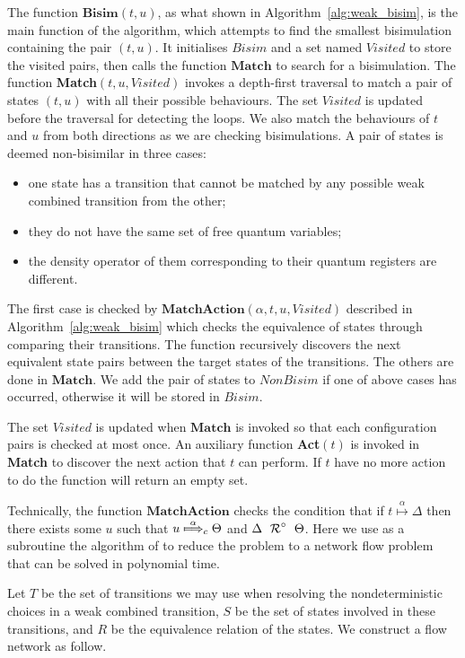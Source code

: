 \documentclass[a4paper,runningheads]{llncs}
\newcommand{\lift}[1]{\mathrel{{#1}^\circ}}
\begin{document}
The function $\textbf{Bisim}(t,u)$, as what shown in Algorithm~\ref{alg:weak_bisim}, is the main function of the algorithm, which attempts to find the smallest bisimulation containing the pair $(t,u)$. It initialises $Bisim$ and a set named $Visited$ to store the visited pairs, then calls the function $\textbf{Match}$ to search for a bisimulation. The function \textbf{Match}$(t,u,Visited)$ invokes a depth-first traversal to match a pair of states $(t,u)$ with all their possible behaviours. The set $Visited$ is updated before the traversal for detecting the loops. We also match the behaviours of $t$ and $u$ from both directions as we are checking bisimulations. A pair of states is deemed non-bisimilar in three cases:
\begin{itemize}
    \item one state has a transition that cannot be matched by any possible weak combined transition from the other;
    \item they do not have the same set of free quantum variables;
    \item the density operator of them corresponding to their quantum registers are different.
\end{itemize}
The first case is checked by $\textbf{MatchAction}(\alpha,t,u,Visited)$ described in Algorithm~\ref{alg:weak_bisim} which checks the equivalence of states through comparing their transitions. The function recursively discovers the next equivalent state pairs between the target states of the transitions. The others are done in $\textbf{Match}$. We add the pair of states to $NonBisim$ if one of above cases has occurred, otherwise it will be stored in $Bisim$.

The set $Visited$ is updated when $\textbf{Match}$ is invoked so that each configuration pairs is checked at most once.
An auxiliary function \textbf{Act}$(t)$ is invoked in \textbf{Match} to discover the next action that $t$ can perform. If $t$ have no more action to do the function will return an empty set.

Technically, the function $\textbf{MatchAction}$ checks the condition that if $t\overset{\alpha}{\longmapsto}\Delta$ then there exists some $u$ such that $u\overset{\alpha}{\mapstochar\Longrightarrow}_{c}\Theta$ and $\Delta~\lift{\aRel}~\Theta$. Here we use as a subroutine the algorithm of \cite{TH15} to reduce the problem to a network flow problem that can be solved  in polynomial time.

Let $T$ be the set of transitions we may use when resolving the nondeterministic choices in a weak combined transition, $S$ be the set of states involved in these transitions, and $R$ be the equivalence relation of the states. We construct a flow network as follow.
\end{document}
